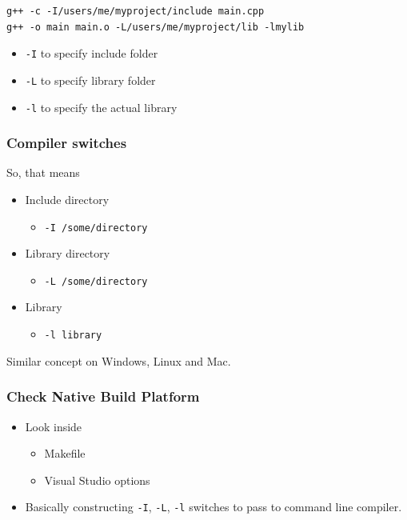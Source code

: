 \begin{verbatim}
g++ -c -I/users/me/myproject/include main.cpp
g++ -o main main.o -L/users/me/myproject/lib -lmylib
\end{verbatim}

\begin{itemize}
\itemsep1pt\parskip0pt
\item
  \texttt{-I} to specify include folder
\item
  \texttt{-L} to specify library folder
\item
  \texttt{-l} to specify the actual library
\end{itemize}

\subsubsection{Compiler switches}\label{compiler-switches}

So, that means

\begin{itemize}
\itemsep1pt\parskip0pt
\item
  Include directory

  \begin{itemize}
  \itemsep1pt\parskip0pt
  \item
    \texttt{-I /some/directory}
  \end{itemize}
\item
  Library directory

  \begin{itemize}
  \itemsep1pt\parskip0pt
  \item
    \texttt{-L /some/directory}
  \end{itemize}
\item
  Library

  \begin{itemize}
  \itemsep1pt\parskip0pt
  \item
    \texttt{-l library}
  \end{itemize}
\end{itemize}

Similar concept on Windows, Linux and Mac.

\subsubsection{Check Native Build
Platform}\label{check-native-build-platform}

\begin{itemize}
\itemsep1pt\parskip0pt
\item
  Look inside

  \begin{itemize}
  \itemsep1pt\parskip0pt
  \item
    Makefile
  \item
    Visual Studio options
  \end{itemize}
\item
  Basically constructing \texttt{-I}, \texttt{-L}, \texttt{-l} switches
  to pass to command line compiler.
\end{itemize}

